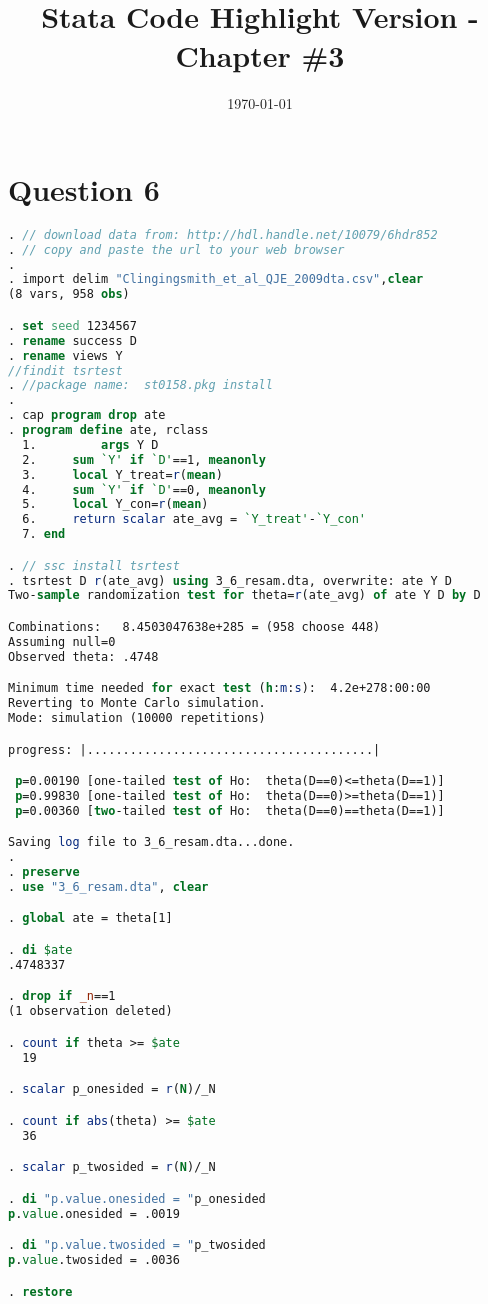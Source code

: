 \documentclass[a4paper]{article}
\begin{document}
\title{Stata Code Highlight Version - Chapter \#3}
\author{ }
\date{\today}
\maketitle



\section*{Question 6}
\begin{lstlisting}[language=stata]
. // download data from: http://hdl.handle.net/10079/6hdr852
. // copy and paste the url to your web browser
. 
. import delim "Clingingsmith_et_al_QJE_2009dta.csv",clear
(8 vars, 958 obs)

. set seed 1234567
. rename success D
. rename views Y
//findit tsrtest
. //package name:  st0158.pkg install
. 
. cap program drop ate
. program define ate, rclass
  1.         args Y D
  2.     sum `Y' if `D'==1, meanonly
  3.     local Y_treat=r(mean)
  4.     sum `Y' if `D'==0, meanonly
  5.     local Y_con=r(mean)
  6.     return scalar ate_avg = `Y_treat'-`Y_con'
  7. end

. // ssc install tsrtest
. tsrtest D r(ate_avg) using 3_6_resam.dta, overwrite: ate Y D
Two-sample randomization test for theta=r(ate_avg) of ate Y D by D

Combinations:   8.4503047638e+285 = (958 choose 448)
Assuming null=0
Observed theta: .4748

Minimum time needed for exact test (h:m:s):  4.2e+278:00:00
Reverting to Monte Carlo simulation.
Mode: simulation (10000 repetitions)

progress: |........................................|

 p=0.00190 [one-tailed test of Ho:  theta(D==0)<=theta(D==1)]
 p=0.99830 [one-tailed test of Ho:  theta(D==0)>=theta(D==1)]
 p=0.00360 [two-tailed test of Ho:  theta(D==0)==theta(D==1)]

Saving log file to 3_6_resam.dta...done.
.   
. preserve 
. use "3_6_resam.dta", clear

. global ate = theta[1]

. di $ate
.4748337

. drop if _n==1
(1 observation deleted)

. count if theta >= $ate
  19

. scalar p_onesided = r(N)/_N

. count if abs(theta) >= $ate
  36

. scalar p_twosided = r(N)/_N

. di "p.value.onesided = "p_onesided
p.value.onesided = .0019

. di "p.value.twosided = "p_twosided 
p.value.twosided = .0036

. restore
\end{lstlisting}
\end{document}
